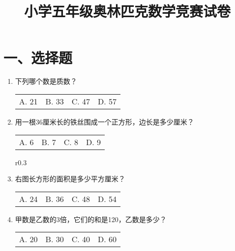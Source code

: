 \documentclass[14pt]{article}
\begin{document}
\title{小学五年级奥林匹克数学竞赛试卷}
\author{}
\date{}
\maketitle

\section*{一、选择题}
\begin{enumerate}
\item 下列哪个数是质数？\\
\begin{tabular}{llll}
A. 21 & B. 33 & C. 47 & D. 57
\end{tabular}

\item 用一根36厘米长的铁丝围成一个正方形，边长是多少厘米？\\
\begin{tabular}{llll}
A. 6 & B. 7 & C. 8 & D. 9
\end{tabular}

\begin{wrapfigure}{r}{0.3\textwidth}
\centering
{}
\end{wrapfigure}

\item 右图长方形的面积是多少平方厘米？\\
\begin{tabular}{llll}
A. 24 & B. 36 & C. 48 & D. 54
\end{tabular}

\item 甲数是乙数的3倍，它们的和是120，乙数是多少？\\
\begin{tabular}{llll}
A. 20 & B. 30 & C. 40 & D. 60
\end{tabular}
\end{enumerate}
\end{document}

